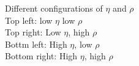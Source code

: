 \documentclass[twoside,twocolumn]{article}
\begin{document}
\begin{figure}[!htb]
	\qquad
	\caption{Different configurations of $\eta$ and $\rho$\\Top left: low $\eta$ low $\rho$\\Top right: Low $\eta$, high $\rho$\\Bottm left: High $\eta$, low $\rho$\\Bottom right: High $\eta$, high $\rho$}\label{fig:configs}
\end{figure}
\end{document}
